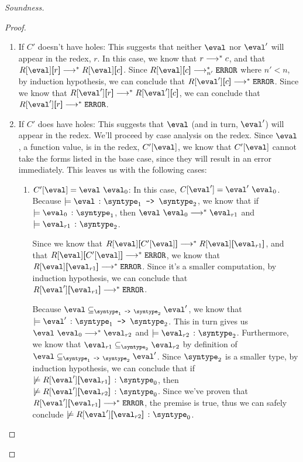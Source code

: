 \begin{proof}[Soundness]
\begin{proof}
    \begin{enumerate}
      \item If $C'$ doesn't have holes: This suggests that neither $\eval$ nor $\eval'$ will appear in the redex, $r$. In this case, we know that $r \smallsteps[] c$, and that $\redcon{\eval}{r} \smallsteps[] \redcon{\eval}{c}$. Since $\redcon{\eval}{c} \smallsteps[n'] \eerror$ where $n' < n$, by induction hypothesis, we can conclude that $\redcon{\eval'}{c} \smallsteps[] \eerror$. Since we know that $\redcon{\eval'}{r} \smallsteps[] \redcon{\eval'}{c}$, we can conclude that $\redcon{\eval'}{r} \smallsteps[] \eerror$.
      \item If $C'$ does have holes: This suggests that $\eval$ (and in turn, $\eval'$) will appear in the redex. We'll proceed by case analysis on the redex. Since $\eval$, a function value, is in the redex, $C'[\eval]$, we know that $C'[\eval]$ cannot take the forms listed in the base case, since they will result in an error immediately. This leaves us with the following cases:
      \begin{enumerate}
        \item $C'[\eval] = \eval \ \eval_0$: In this case, $C[\eval'] = \eval' \ \eval_0$. Because $\models \hastype{\eval}{\mkfun{\syntype_1}{\syntype_2}}$, we know that if $\models \hastype{\eval_0}{\syntype_1}$, then $\eval \ \eval_0 \smallsteps[] \eval_{r1}$ and $\models \hastype{\eval_{r1}}{\syntype_2}$. 
        
        Since we know that $\redcon{\eval}{C'[\eval]} \smallsteps[] \redcon{\eval}{\eval_{r1}}$, and that $\redcon{\eval}{C'[\eval]} \smallsteps[] \eerror$, we know that 
        $\redcon{\eval}{\eval_{r1}} \smallsteps[] \eerror$. Since it's a smaller computation, by induction hypothesis, we can conclude that $\redcon{\eval'}{\eval_{r1}} \smallsteps[] \eerror$.

        Because $\eval \subseteq_{\mkfun{\syntype_1}{\syntype_2}} \eval'$, we know that $\models \hastype{\eval'}{\mkfun{\syntype_1}{\syntype_2}}$. This in turn gives us $\eval \ \eval_0 \smallsteps[] \eval_{r2}$ and $\models \hastype{\eval_{r2}}{\syntype_2}$. Furthermore, we know that $\eval_{r1} \subseteq_{\syntype_2} \eval_{r2}$ by definition of $\eval \subseteq_{\mkfun{\syntype_1}{\syntype_2}} \eval'$. Since $\syntype_2$ is a smaller type, by induction hypothesis, we can conclude that if $\not \models \hastype{\redcon{\eval'}{\eval_{r1}}}{\syntype_0}$, then $\not \models \hastype{\redcon{\eval'}{\eval_{r2}}}{\syntype_0}$. Since we've proven that $\redcon{\eval'}{\eval_{r1}} \smallsteps[] \eerror$, the premise is true, thus we can safely conclude $\not \models \hastype{\redcon{\eval'}{\eval_{r2}}}{\syntype_0}$.


\end{enumerate}
\end{enumerate}
\end{proof}
\end{proof}

